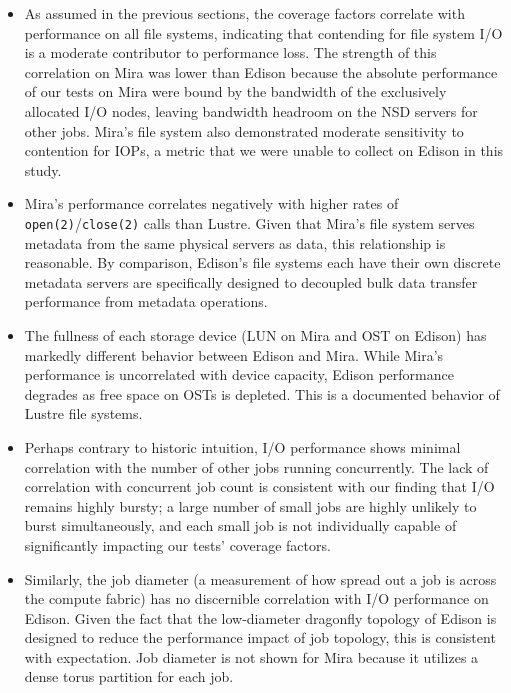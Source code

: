 \begin{itemize}

\item As assumed in the previous sections, the coverage factors correlate with performance on all file systems, indicating that contending for file system I/O is a moderate contributor to performance loss.
The strength of this correlation on Mira was lower than Edison because the absolute performance of our tests on Mira were bound by the bandwidth of the exclusively allocated I/O nodes, leaving bandwidth headroom on the NSD servers for other jobs.
Mira's file system also demonstrated moderate sensitivity to contention for
IOPs, a metric that we were unable to collect on Edison in this study.

\item Mira's performance correlates negatively with higher rates of \texttt{open(2)}/\texttt{close(2)} calls than Lustre.
Given that Mira's file system serves metadata from the same physical servers as data, this relationship is reasonable.
By comparison, Edison's file systems each have their own discrete metadata servers are specifically designed to decoupled bulk data transfer performance from metadata operations.

\item The fullness of each storage device (LUN on Mira and OST on Edison) has markedly different behavior between Edison and Mira.
While Mira's performance is uncorrelated with device capacity, Edison performance degrades as free space on OSTs is depleted.
This is a documented behavior of Lustre file systems.

\item Perhaps contrary to historic intuition, I/O performance shows minimal correlation with the number of other jobs running concurrently.
The lack of correlation with concurrent job count is consistent with our finding that I/O remains highly bursty; a large number of small jobs are highly unlikely to burst simultaneously, and each small job is not individually capable of significantly impacting our tests' coverage factors.

\item Similarly, the job diameter (a measurement of how spread out a job is across the compute fabric) has no discernible correlation with I/O performance on Edison.
Given the fact that the low-diameter dragonfly topology of Edison is designed
to reduce the performance impact of job topology, this is consistent with
expectation.  Job diameter is not shown for Mira because it utilizes a dense
torus partition for each job.

\end{itemize}

